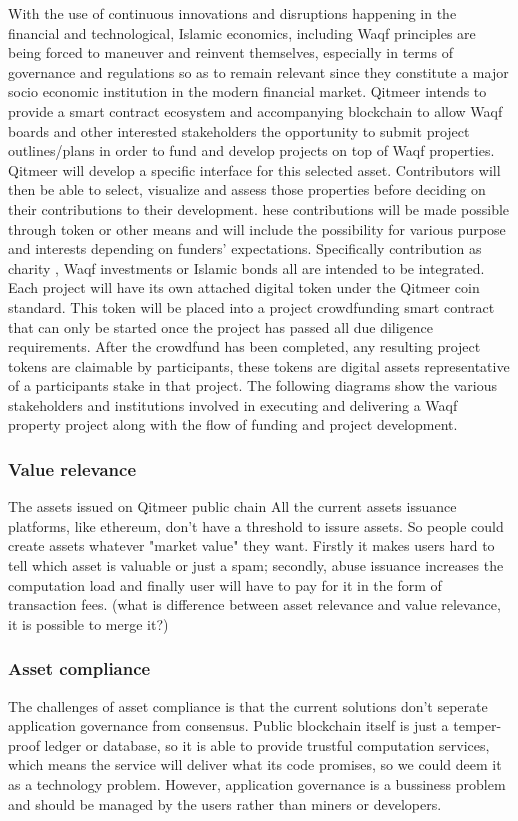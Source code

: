 \documentclass[a4paper,11pt]{article}
\begin{document}
With the use of continuous innovations and disruptions happening in the financial and technological, Islamic economics, including Waqf principles are being forced to maneuver and reinvent themselves, especially in terms of governance and regulations so as to remain relevant since they constitute a major socio economic institution in the modern financial market. 
Qitmeer intends to provide a smart contract ecosystem and accompanying blockchain to allow Waqf boards and other interested stakeholders the opportunity to submit project outlines/plans in order to fund and develop projects on top of Waqf properties. 
Qitmeer will develop a specific interface for this selected asset. Contributors will then be able to select, visualize and assess those properties before deciding on their contributions to their development.
hese contributions will be made possible through token or other means and will include the possibility for various purpose and interests depending on funders’ expectations. Specifically contribution as charity , Waqf investments or Islamic bonds all are intended to be integrated. Each project will have its own attached digital token under the Qitmeer coin standard. This token will be placed into a project crowdfunding smart contract that can only be started once the project has passed all due diligence requirements.
After the crowdfund has been completed, any resulting project tokens are claimable by participants, these tokens are digital assets representative of a participants stake in that project. The following diagrams show the various stakeholders and institutions involved in executing and delivering a Waqf property project along with the flow of funding and project development.



\subsubsection{Value relevance}
The assets issued on Qitmeer public chain All the current assets issuance platforms, like ethereum, don't have a threshold to issure assets. So people could create assets whatever "market value" they want. Firstly it makes users hard to tell which asset is valuable or just a spam; secondly, abuse issuance increases the computation load and finally user will have to pay for it in the form of transaction fees.
 (what is difference between asset relevance and value relevance, it is possible to merge it?)


\subsubsection{Asset compliance}
The challenges of asset compliance is that the current solutions don't seperate application governance from consensus. Public blockchain itself is just a temper-proof ledger or database, so it is able to provide trustful computation services, which means the service will deliver what its code promises, so we could deem it as a technology problem. However, application governance is a bussiness problem and should be managed by the users rather than miners or developers. 
\end{document}
